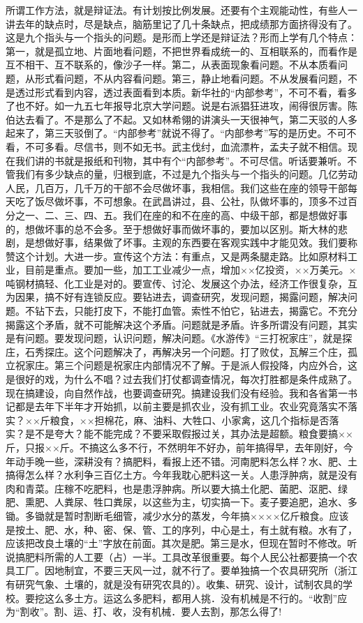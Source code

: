 所谓工作方法，就是辩证法。有计划按比例发展。还要有个主观能动性，有些人一讲去年的缺点时，尽是缺点，脑筋里记了几十条缺点，把成绩那方面挤得没有了。这是九个指头与一个指头的问题。是形而上学还是辩证法？形而上学有几个特点：第一，就是孤立地、片面地看问题，不把世界看成统一的、互相联系的，而看作是互不相干、互不联系的，像沙子一样。第二，从表面现象看问题。不从本质看问题，从形式看问题，不从内容看问题。第三，静止地看问题。不从发展看问题，不是透过形式看到内容，透过表面看到本质。新华社的“内部参考”，不可不看，看多了也不好。如一九五七年报导北京大学问题。说是右派猖狂进攻，闹得很厉害。陈伯达去看了。不是那么了不起。又如林希翎的讲演头一天很神气，第二天驳的人多起来了，第三天驳倒了。“内部参考”就说不得了。“内部参考”写的是历史。不可不看，不可多看。尽信书，则不如无书。武主伐纣，血流漂杵，孟夫子就不相信。现在我们讲的书就是报纸和刊物，其中有个“内部参考”。不可尽信。听话要兼听。不管我们有多少缺点的量，归根到底，不过是九个指头与一个指头的问题。几亿劳动人民，几百万，几千万的干部不会尽做坏事，我相信。我们这些在座的领导干部每天吃了饭尽做坏事，不可想象。在武昌讲过，县、公社，队做坏事的，顶多不过百分之一、二、三、四、五。我们在座的和不在座的高、中级干部，都是想做好事的，想做坏事的总不会多。至于想做好事而做坏事的，要加以区别。斯大林的悲剧，是想做好事，结果做了坏事。主观的东西要在客观实践中才能见效。我们要称赞这个计划。大进一步。宣传这个方法：有重点，又是两条腿走路。比如原材料工业，目前是重点。要加一些，加工工业减少一点，增加××亿投资，××万美元。×吨钢材搞轻、化工业是对的。要宣传、讨沦、发展这个办法，经济工作很复杂，互为因果，搞不好有连锁反应。要钻进去，调查研究，发现问题，揭露问题，解决问题。不钻下去，只能打皮下，不能打血管。索性不怕它，钻进去，揭露它。不充分揭露这个矛盾，就不可能解决这个矛盾。问题就是矛盾。许多所谓没有问题，其实是有问题。要发现问题，认识问题，解决问题。《水游传》“三打祝家庄”，就是探庄，石秀探庄。这个问题解决了，再解决另一个问题。打了败仗，瓦解三个庄，孤立祝家庄。第三个问题是祝家庄内部情况不了解。于是派人假投降，内应外合，这是很好的戏，为什么不唱？过去我们打仗都调查情况，每次打胜都是条件成熟了。现在搞建设，向自然作战，也要调查研究。搞建设我们没有经验。我和各省第一书记都是去年下半年才开始抓，以前主要是抓农业，没有抓工业。农业究竟落实不落实？××斤粮食，××担棉花，麻、油料、大牲口、小家禽，这几个指标是否落实？是不是夸大？能不能完成？不要采取假报过关，其办法是超额。粮食要搞××斤，只报××斤。不搞这么多不行，不然明年不好办，前年搞得早，去年刚好，今年动手晚一些，深耕没有？搞肥料，看报上还不错。河南肥料怎么样？水、肥、土搞得怎么样？水利争三百亿土方。今年我耽心肥料这一关。人患浮肿病，就是没有肉和青菜。庄稼不吃肥料，也是患浮肿病。所以要大搞土化肥、菌肥、沤肥、绿肥、熏肥、人粪尿、牲口粪尿，以这些为主，切实搞一下。麦子要追肥，追水、多锄。多锄就是暂时割断毛细管，减少水分的蒸发，今年搞××××亿斤粮食。应该是按土、肥、水，种、密、保、管、工的序列，中心是土，有土就有粮。水有了，应该把改良土壤的“土”字放在前面。其次是肥。第三是水，但现在暂时不修改。听说搞肥料所需的人工要（占）一半。工具改革很重要。每个人民公社都要搞一个农具工厂。因地制宜，不要三天风一过，就不行了。要单独搞一个农具研究所（浙江有研究气象、土壤的，就是没有研究农具的）。收集、研究、设计，试制农具的学校。要挖这么多土方。运这么多肥料，都用人挑．没有机械是不行的。“收割”应为“割收”。割、运、打、收，没有机械．要人去割，那怎么得了!

